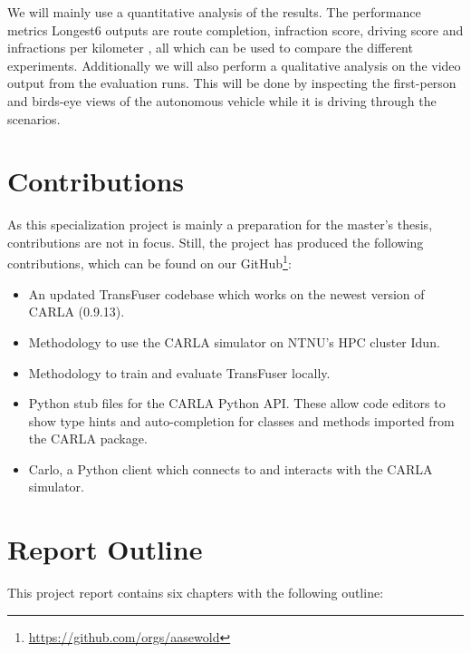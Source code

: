 We will mainly use a quantitative analysis of the results. The performance metrics Longest6 outputs are route completion, infraction score, driving score and infractions per kilometer \cite{transfuser-pami}, all which can be used to compare the different experiments. Additionally we will also perform a qualitative analysis on the video output from the evaluation runs. This will be done by inspecting the first-person and birds-eye views of the autonomous vehicle while it is driving through the scenarios.

\section{Contributions}
As this specialization project is mainly a preparation for the master's thesis, contributions are not in focus. Still, the project has produced the following contributions, which can be found on our GitHub\footnote{\url{https://github.com/orgs/aasewold}}:

\begin{itemize}
    \item An updated TransFuser codebase which works on the newest version of CARLA (0.9.13).
    \item Methodology to use the CARLA simulator on NTNU's HPC cluster Idun.
    \item Methodology to train and evaluate TransFuser locally.
    \item Python stub files for the CARLA Python API. These allow code editors to show type hints and auto-completion for classes and methods imported from the CARLA package.
    \item Carlo, a Python client which connects to and interacts with the CARLA simulator.
\end{itemize}


\section{Report Outline} %
This project report contains six chapters with the following outline:

